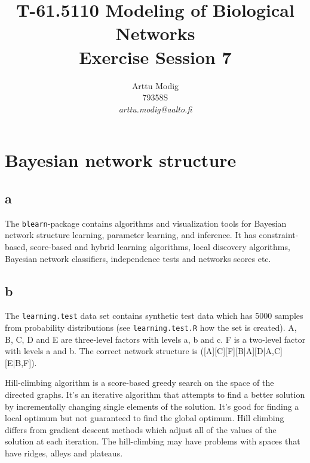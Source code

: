 \documentclass[a4paper,english]{article}
\title{T-61.5110 Modeling of Biological Networks \\ Exercise Session 7}
\author{Arttu Modig \\ 79358S \\
       {\it arttu.modig@aalto.fi}}
\begin{document}
\maketitle


\onehalfspacing
\section{Bayesian network structure}
\subsection*{a}
The \texttt{blearn}-package contains algorithms and visualization tools for Bayesian network structure learning, parameter learning, and inference. It has constraint-based, score-based and hybrid learning algorithms, local discovery algorithms, Bayesian network classifiers, independence tests and networks scores etc.

\subsection*{b}
The \texttt{learning.test} data set contains synthetic test data which has 5000 samples from probability distributions (see \texttt{learning.test.R} how the set is created). A, B, C, D and E are three-level factors with levels a, b and c. F is a two-level factor with levels a and b. The correct network structure is ([A][C][F][B|A][D|A,C][E|B,F]).

Hill-climbing algorithm is a score-based greedy search on the space of the directed graphs. It's an iterative algorithm that attempts to find a better solution by incrementally changing single elements of the solution. It's good for finding a local optimum but not guaranteed to find the global optimum. Hill climbing differs from gradient descent methods which adjust all of the values of the solution at each iteration. The hill-climbing may have problems with spaces that have ridges, alleys and plateaus.
\end{document}
